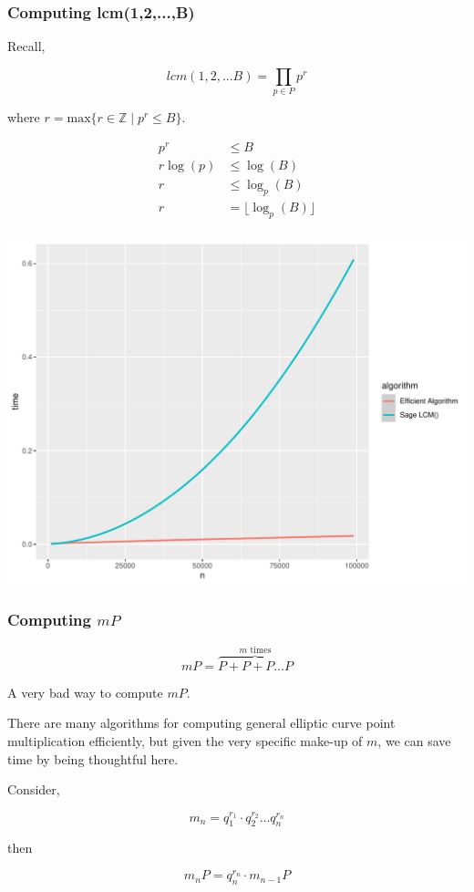 \documentclass{beamer}
\begin{document}
\begin{frame}
\frametitle{Computing lcm(1,2,...,B)}

Recall,

\[ lcm(1,2,...B) = \prod_{p \in P} p^r \]

where $r = \text{max} \{ r \in \mathbb{Z} \mid p^r \leq B \}$.

\begin{align*}
    p^r &\leq B \\
    r\log(p) &\leq \log(B) \\
    r &\leq \log_p(B) \\
    r &= \lfloor \log_p(B) \rfloor \\
\end{align*}

\end{frame}

\begin{frame}

\includegraphics[width=\textwidth]{graphs/lcm_comparison.pdf}

\end{frame}

\begin{frame}
\frametitle{Computing $mP$}

\[ mP = \overbrace{P + P + P \ldots P}^\text{$m$ times} \]
\begin{center}
    A very bad way to compute $mP$.
\end{center}

There are many algorithms for computing general elliptic curve point multiplication efficiently, but given the very specific make-up of $m$, we can save time by being thoughtful here.

Consider,

\[ m_n = q_1^{r_1} \cdot q_2^{r_2} \ldots q_n^{r_n} \]

then

\[ m_nP = q_n^{r_n} \cdot m_{n-1}P \]

\end{frame}
\end{document}
